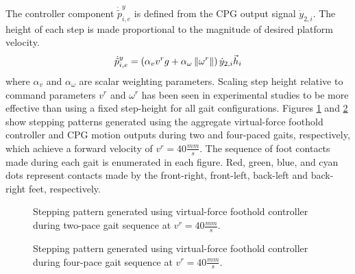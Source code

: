 		The controller component $\dot{\tilde{p}}_{i,e}^{y}$ is defined from the CPG output signal $\dot{y}_{2,i}$. The height of each step is made proportional to the magnitude of desired platform velocity.
			\begin{equation}
				\dot{\tilde{p}}_{i,e}^{y} 	= { \left( \alpha_{v} v^{r}g + \alpha_{\omega} \left\lVert\omega^{r}\right\rVert \right) \dot{y}_{2,i}} \vec{h}_{i} 
				\label{eq::foot_height_control}
			\end{equation}
		where $\alpha_{v}$ and $\alpha_{\omega}$ are scalar weighting parameters. Scaling step height relative to command parameters $v^{r}$ and $\omega^{r}$ has been seen in experimental studies to be more effective than using a fixed step-height for all gait configurations. Figures \ref{fig::foot_motion2} and \ref{fig::foot_motion4} show stepping patterns generated using the aggregate virtual-force foothold controller and CPG motion outputs during two and four-paced gaits, respectively, which achieve a forward velocity of $v^{r}=40\frac{mm}{s}$. The sequence of foot contacts made during each gait is enumerated in each figure. Red, green, blue, and cyan dots represent contacts made by the front-right, front-left, back-left and back-right feet, respectively.
%
			\begin{figure}[!h]
				\centering
				\caption{Stepping pattern generated using virtual-force foothold controller during two-pace gait sequence at $v^{r}=40\frac{mm}{s}$.}
				\label{fig::foot_motion2}
			\end{figure}
			\begin{figure}[!h]
				\centering
				\caption{Stepping pattern generated using virtual-force foothold controller during four-pace gait sequence at $v^{r}=40\frac{mm}{s}$.}
				\label{fig::foot_motion4}
			\end{figure}
%




